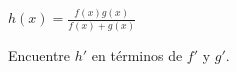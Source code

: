 \setcounter{enumi}{64}
\item $\displaystyle h(x) = \frac{f(x)g(x)}{f(x) + g(x)}$
\par
Encuentre $h'$ en términos de $f'$ y $g'$.
